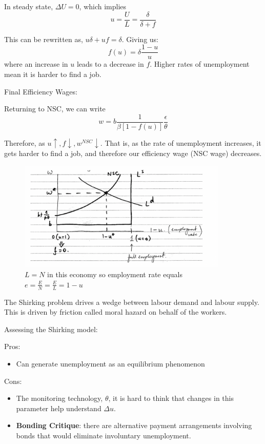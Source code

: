 \documentclass[11pt]{article}
\begin{document}
In steady state, $\Delta U=0$, which implies
\[u = \dfrac{U}{L} = \dfrac{\delta}{\delta+f}\]

\begin{note}
    This can be rewritten as, $u\delta + uf = \delta$. Giving us:
    \[f(u) = \delta \dfrac{1-u}{u}\]
    where an increase in $u$ leads to a decrease in $f$. Higher rates of unemployment mean it is harder to find a job.
\end{note}

\begin{shaded}
    Final Efficiency Wages:

    Returning to NSC, we can write
    \[w = b \dfrac{1}{\beta[1-f(u)]}\dfrac{\epsilon}{\theta}\]

    Therefore, as $u\uparrow, f\downarrow, w^{NSC}\downarrow$. That is, as the rate of unemployment increases, it gets harder to find a job, and therefore our efficiency wage (NSC wage) decreases.
\end{shaded}

    \begin{figure}[h]
        \centering
        \includegraphics[width=10cm]{photos/NSC diagram.png}
        \caption{$L=N$ in this economy so employment rate equals $e = \frac{E}{N} = \frac{E}{L} = 1-u$}
        \label{fig:my_label}
    \end{figure}

    \begin{intu}
        The Shirking problem drives a wedge between labour demand and labour supply. This is driven by friction called moral hazard on behalf of the workers.
    \end{intu}

    \begin{shaded}
        Assessing the Shirking model:

        Pros:
        \begin{itemize}
            \item Can generate unemployment as an equilibrium phenomenon
        \end{itemize}
        Cons:
        \begin{itemize}
            \item The monitoring technology, $\theta$, it is hard to think that changes in this parameter help understand $\Delta u$.
            \item \textbf{Bonding Critique}: there are alternative payment arrangements involving bonds that would eliminate involuntary unemployment.
        \end{itemize}
    \end{shaded}
\end{document}

